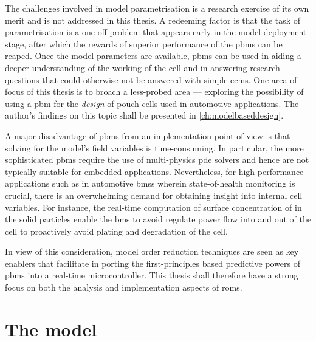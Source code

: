 The challenges involved  in model parametrisation is a research  exercise of its
own merit and  is not addressed in  this thesis. A redeeming factor  is that the
task of  parametrisation is a  one-off problem that  appears early in  the model
deployment  stage,  after which  the  rewards  of  superior performance  of  the
\glspl{pbm} can be reaped. Once  the model parameters are available, \glspl{pbm}
can be used in  aiding a deeper understanding of the working of  the cell and in
answering research  questions that could  otherwise not be answered  with simple
\glspl{ecm}. One area  of focus of this  thesis is to broach  a less-probed area
--- exploring  the possibility  of using  a \gls{pbm}  for the  \emph{design} of
pouch cells used in automotive applications. The author's findings on this topic
shall be presented in \cref{ch:modelbaseddesign}.

A major disadvantage of \glspl{pbm} from an implementation point of view is that
solving for  the model's field  variables is time-consuming. In  particular, the
more  sophisticated  \glspl{pbm}  require  the use  of  multi-physics  \gls{pde}
solvers  and  hence  are  not  typically  suitable  for  embedded  applications.
Nevertheless,  for   high  performance   applications  such  as   in  automotive
\glspl{bms}  wherein   state-of-health  monitoring  is  crucial,   there  is  an
overwhelming  demand for  obtaining insight  into internal  cell variables.  For
instance, the real-time computation of surface concentration of  in the
solid particles enable  the \gls{bms} to avoid regulate power  flow into and out
of the cell to proactively avoid plating and degradation of the cell.

In view of this consideration, model  order reduction techniques are seen as key
enablers that facilitate in porting the first-principles based predictive powers
of \glspl{pbm}  into a  real-time microcontroller.  This thesis  shall therefore
have  a  strong  focus  on  both the  analysis  and  implementation  aspects  of
\glspl{rom}.

\section{The  model}

